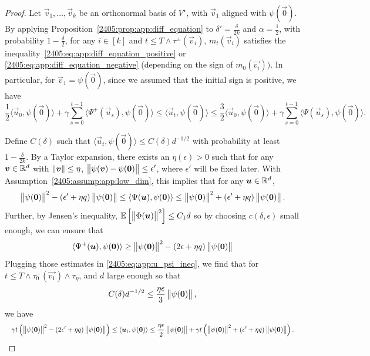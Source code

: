 \begin{proof}
  Let $\vec{v}_1, \dots, \vec{v}_k$ be an orthonormal basis of $V^\star$, with $\vec{v}_1$ aligned with $\psi(\vec{0})$. By applying Proposition~\ref{2405:prop:app:diff_equation} to $\delta' = \frac{\delta}{2k}$ and $\alpha = \frac12$, with probability $1 - \frac\delta2$, for any $i \in [k]$ and $t \leq T \wedge \tau^{\pm}(\vec{v}_i)$, $m_t(\vec{v}_i)$ satisfies the inequality~\eqref{2405:eq:app:diff_equation_positive} or \eqref{2405:eq:app:diff_equation_negative} (depending on the sign of $m_0(\vec{v_i}))$. In particular, for $\vec{v}_1 = \psi(\vec{0})$, since we assumed that the initial sign is positive, we have
  \begin{equation}\label{2405:eq:app:u_psi_ineq}
    \frac12 \langle \vec{u}_0, \psi(\vec{0}) \rangle + \gamma\sum_{s=0}^{t-1} \langle \Psi^+(\vec{u}_s), \psi(\vec{0}) \rangle \leq \langle \vec{u}_t, \psi(\vec{0}) \rangle \leq  \frac32 \langle \vec{u}_0, \psi(\vec{0}) \rangle + \gamma\sum_{s=0}^{t-1} \langle \Psi(\vec{u}_s), \psi(\vec{0}) \rangle.
  \end{equation}

  Define $C(\delta)$ such that  $\langle \vec{u}_t, \psi(\vec{0}) \rangle \leq C(\delta)d^{-1/2}$ with probability at least $1 - \frac{\delta}{2k}$. By a Taylor expansion, there exists an $\eta(\epsilon) > 0$ such that for any ${\boldsymbol{v}} \in \mathbb{R}^d$ with $\left\lVert {\boldsymbol{v}}\right\rVert \leq \eta$, $\left\lVert \psi({\boldsymbol{v}}) - \psi({\boldsymbol{0}})\right\rVert \leq \epsilon'$, where $\epsilon'$ will be fixed later. With Assumption~\ref{2405:assump:app:low_dim}, this implies that for any ${\boldsymbol{u}} \in \mathbb{R}^d$,
  \[ \left\lVert \psi({\boldsymbol{0}})\right\rVert^2 - (\epsilon' + \eta q) \left\lVert \psi({\boldsymbol{0}})\right\rVert \leq \langle \Psi({\boldsymbol{u}}), \psi({\boldsymbol{0}}) \rangle \leq \left\lVert \psi({\boldsymbol{0}})\right\rVert^2 + (\epsilon' + \eta q) \left\lVert \psi({\boldsymbol{0}})\right\rVert. \]
  Further, by Jensen's inequality, $\mathbb{E}\left[\left\lVert \Phi({\boldsymbol{u}})\right\rVert^2\right] \leq C_1 d$ so by choosing $c(\delta, \epsilon)$ small enough, we can ensure that
  \[ \langle \Psi^+({\boldsymbol{u}}), \psi({\boldsymbol{0}}) \rangle \geq \left\lVert \psi({\boldsymbol{0}})\right\rVert^2 - (2\epsilon + \eta q) \left\lVert \psi({\boldsymbol{0}})\right\rVert \]
  Plugging those estimates in \eqref{2405:eq:app:u_psi_ineq}, we find that for $t \leq T \wedge \tau_0^-(\vec{v_1}) \wedge \tau_\eta$, and $d$ large enough so that
  \[ C(\delta)d^{-1/2}\leq \frac{\eta\epsilon}{3} \left\lVert \psi({\boldsymbol{0}})\right\rVert, \]
  we have
  \begin{equation}
    \resizebox{\linewidth}{!}{$\displaystyle
      \gamma t \left(\norm{\psi(\vec{0})}^2 - (2\epsilon' + \eta q) \norm{\psi(\vec{0})}\right)  \leq \langle \vec{u}_t, \psi(\vec{0}) \rangle \leq \frac{\eta\epsilon}{2} \norm{\psi(\vec{0})} + \gamma t  \left(\norm{\psi(\vec{0})}^2 + (\epsilon' + \eta q) \norm{\psi(\vec{0})}\right).
    $}
  \end{equation}


\end{proof}
